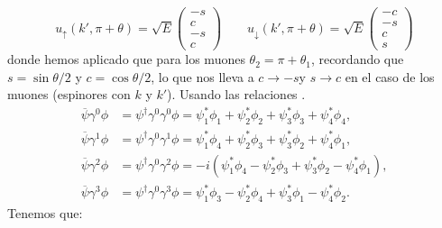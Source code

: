 \begin{equation}
	u_\uparrow(k',\pi+\theta) = \sqrt{E} \begin{pmatrix}
		-s \\ c \\ -s \\ c
	\end{pmatrix}  \qquad 
	u_\downarrow(k',\pi + \theta) = \sqrt{E} \begin{pmatrix}
		-c \\ -s \\ c \\ s
	\end{pmatrix} 
\end{equation}
donde hemos aplicado que para los muones $\theta_2 = \pi + \theta_1$, recordando que $s=\sin \theta/2$ y $c=\cos\theta/2$,  lo que nos lleva a $c\to -s $y  $s \to c$ en el caso de los muones (espinores con $k$ y $k'$). Usando las relaciones \cite{SaboridoSilva2025ParticlePhysicsI,thomson_modern_physics}. 
\begin{align}
	\overline{\psi}\gamma^0\phi & = \psi^\dagger \gamma^0 \gamma^0 \phi
	= \psi_1^*\phi_1 + \psi_2^*\phi_2 + \psi_3^*\phi_3 + \psi_4^*\phi_4,     \\
	\overline{\psi}\gamma^1\phi & = \psi^\dagger \gamma^0 \gamma^1 \phi
	= \psi_1^*\phi_4 + \psi_2^*\phi_3 + \psi_3^*\phi_2 + \psi_4^*\phi_1,     \\
	\overline{\psi}\gamma^2\phi & = \psi^\dagger \gamma^0 \gamma^2 \phi
	= -i(\psi_1^*\phi_4 - \psi_2^*\phi_3 + \psi_3^*\phi_2 - \psi_4^*\phi_1), \\
	\overline{\psi}\gamma^3\phi & = \psi^\dagger \gamma^0 \gamma^3 \phi
	= \psi_1^*\phi_3 - \psi_2^*\phi_4 + \psi_3^*\phi_1 - \psi_4^*\phi_2.
\end{align}
Tenemos que:

